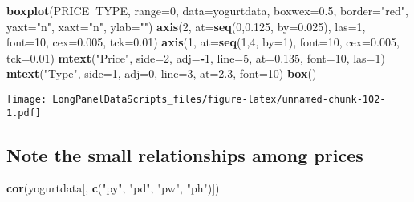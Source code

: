 \documentclass[]{book}
\newenvironment{Shaded}{\begin{snugshade}}{\end{snugshade}}
\newcommand{\DataTypeTok}[1]{\textcolor[rgb]{0.13,0.29,0.53}{#1}}
\newcommand{\DecValTok}[1]{\textcolor[rgb]{0.00,0.00,0.81}{#1}}
\newcommand{\FloatTok}[1]{\textcolor[rgb]{0.00,0.00,0.81}{#1}}
\newcommand{\KeywordTok}[1]{\textcolor[rgb]{0.13,0.29,0.53}{\textbf{#1}}}
\newcommand{\NormalTok}[1]{#1}
\newcommand{\OperatorTok}[1]{\textcolor[rgb]{0.81,0.36,0.00}{\textbf{#1}}}
\newcommand{\StringTok}[1]{\textcolor[rgb]{0.31,0.60,0.02}{#1}}
\begin{document}
\begin{Shaded}
\begin{Highlighting}[]
\KeywordTok{boxplot}\NormalTok{(PRICE}\OperatorTok{~}\NormalTok{TYPE, }\DataTypeTok{range=}\DecValTok{0}\NormalTok{, }\DataTypeTok{data=}\NormalTok{yogurtdata, }\DataTypeTok{boxwex=}\FloatTok{0.5}\NormalTok{, }\DataTypeTok{border=}\StringTok{"red"}\NormalTok{, }\DataTypeTok{yaxt=}\StringTok{"n"}\NormalTok{, }\DataTypeTok{xaxt=}\StringTok{"n"}\NormalTok{, }\DataTypeTok{ylab=}\StringTok{""}\NormalTok{)}
\KeywordTok{axis}\NormalTok{(}\DecValTok{2}\NormalTok{, }\DataTypeTok{at=}\KeywordTok{seq}\NormalTok{(}\DecValTok{0}\NormalTok{,}\FloatTok{0.125}\NormalTok{, }\DataTypeTok{by=}\FloatTok{0.025}\NormalTok{), }\DataTypeTok{las=}\DecValTok{1}\NormalTok{, }\DataTypeTok{font=}\DecValTok{10}\NormalTok{, }\DataTypeTok{cex=}\FloatTok{0.005}\NormalTok{, }\DataTypeTok{tck=}\FloatTok{0.01}\NormalTok{)}
\KeywordTok{axis}\NormalTok{(}\DecValTok{1}\NormalTok{, }\DataTypeTok{at=}\KeywordTok{seq}\NormalTok{(}\DecValTok{1}\NormalTok{,}\DecValTok{4}\NormalTok{, }\DataTypeTok{by=}\DecValTok{1}\NormalTok{), }\DataTypeTok{font=}\DecValTok{10}\NormalTok{, }\DataTypeTok{cex=}\FloatTok{0.005}\NormalTok{, }\DataTypeTok{tck=}\FloatTok{0.01}\NormalTok{)}
\KeywordTok{mtext}\NormalTok{(}\StringTok{"Price"}\NormalTok{, }\DataTypeTok{side=}\DecValTok{2}\NormalTok{, }\DataTypeTok{adj=}\OperatorTok{-}\DecValTok{1}\NormalTok{, }\DataTypeTok{line=}\DecValTok{5}\NormalTok{, }\DataTypeTok{at=}\FloatTok{0.135}\NormalTok{, }\DataTypeTok{font=}\DecValTok{10}\NormalTok{, }\DataTypeTok{las=}\DecValTok{1}\NormalTok{)}
\KeywordTok{mtext}\NormalTok{(}\StringTok{"Type"}\NormalTok{, }\DataTypeTok{side=}\DecValTok{1}\NormalTok{, }\DataTypeTok{adj=}\DecValTok{0}\NormalTok{, }\DataTypeTok{line=}\DecValTok{3}\NormalTok{, }\DataTypeTok{at=}\FloatTok{2.3}\NormalTok{, }\DataTypeTok{font=}\DecValTok{10}\NormalTok{)}
\KeywordTok{box}\NormalTok{()}
\end{Highlighting}
\end{Shaded}

\texttt{[image: LongPanelDataScripts\_files/figure-latex/unnamed-chunk-102-1.pdf]}

\hypertarget{note-the-small-relationships-among-prices}{%
\subsection{Note the small relationships among prices}\label{note-the-small-relationships-among-prices}}

\begin{Shaded}
\begin{Highlighting}[]
\KeywordTok{cor}\NormalTok{(yogurtdata[, }\KeywordTok{c}\NormalTok{(}\StringTok{"py"}\NormalTok{, }\StringTok{"pd"}\NormalTok{, }\StringTok{"pw"}\NormalTok{, }\StringTok{"ph"}\NormalTok{)])}
\end{Highlighting}
\end{Shaded}
\end{document}

